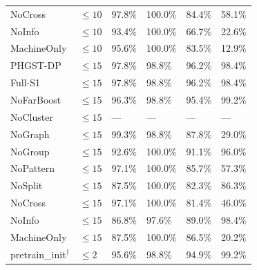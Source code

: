 \begin{table}[p]
\begin{tabularx}{\textwidth}{@{}lXXXXX@{}}
NoCross & $\le 10$ & 97.8\% & 100.0\% & 84.4\% & 58.1\% \\
NoInfo & $\le 10$ & 93.4\% & 100.0\% & 66.7\% & 22.6\% \\
MachineOnly & $\le 10$ & 95.6\% & 100.0\% & 83.5\% & 12.9\% \\
\midrule
PHGST-DP & $\le 15$ & 97.8\% & 98.8\% & 96.2\% & 98.4\% \\
Full-S1 & $\le 15$ & 97.8\% & 98.8\% & 96.2\% & 98.4\% \\
NoFarBoost & $\le 15$ & 96.3\% & 98.8\% & 95.4\% & 99.2\% \\
NoCluster & $\le 15$ & --- & --- & --- & --- \\
NoGraph & $\le 15$ & 99.3\% & 98.8\% & 87.8\% & 29.0\% \\
NoGroup & $\le 15$ & 92.6\% & 100.0\% & 91.1\% & 96.0\% \\
NoPattern & $\le 15$ & 97.1\% & 100.0\% & 85.7\% & 57.3\% \\
NoSplit & $\le 15$ & 87.5\% & 100.0\% & 82.3\% & 86.3\% \\
NoCross & $\le 15$ & 97.1\% & 100.0\% & 81.4\% & 46.0\% \\
NoInfo & $\le 15$ & 86.8\% & 97.6\% & 89.0\% & 98.4\% \\
MachineOnly & $\le 15$ & 87.5\% & 100.0\% & 86.5\% & 20.2\% \\
\midrule
pretrain\_init$^\dagger$ & $\le 2$ & 95.6\% & 98.8\% & 94.9\% & 99.2\% \\
\bottomrule
\end{tabularx}
\end{table}

